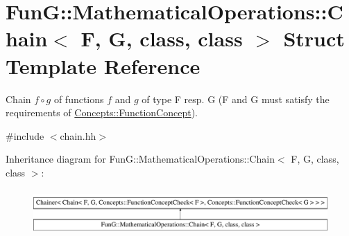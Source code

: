 \hypertarget{structFunG_1_1MathematicalOperations_1_1Chain}{}\section{Fun\+G\+:\+:Mathematical\+Operations\+:\+:Chain$<$ F, G, class, class $>$ Struct Template Reference}
\label{structFunG_1_1MathematicalOperations_1_1Chain}


Chain $ f\circ g $ of functions $f$ and $g$ of type F resp. G (F and G must satisfy the requirements of \hyperlink{structFunG_1_1Concepts_1_1FunctionConcept}{Concepts\+::\+Function\+Concept}).  




{\ttfamily \#include $<$chain.\+hh$>$}

Inheritance diagram for Fun\+G\+:\+:Mathematical\+Operations\+:\+:Chain$<$ F, G, class, class $>$\+:\begin{figure}[H]
\begin{center}
\leavevmode
\includegraphics[height=1.758242cm]{structFunG_1_1MathematicalOperations_1_1Chain}
\end{center}
\end{figure}
